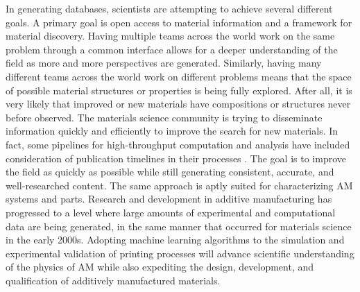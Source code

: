 In generating databases, scientists are attempting to achieve several different goals. A primary goal is open access to material information and a framework for material discovery. Having multiple teams across the world work on the same problem through a common interface allows for a deeper understanding of the field as more and more perspectives are generated. Similarly, having many different teams across the world work on different problems means that the space of possible material structures or properties is being fully explored. After all, it is very likely that improved or new materials have compositions or structures never before observed. The materials science community is trying to disseminate information quickly and efficiently to improve the search for new materials. In fact, some pipelines for high-throughput computation and analysis have included consideration of publication timelines in their processes \cite{Foster2015}. The goal is to improve the field as quickly as possible while still generating consistent, accurate, and well-researched content. The same approach is aptly suited for characterizing AM systems and parts. Research and development in additive manufacturing has progressed to a level where large amounts of experimental and computational data are being generated, in the same manner that occurred for materials science in the early 2000s. Adopting machine learning algorithms to the simulation and experimental validation of printing processes will advance scientific understanding of the physics of AM while also expediting the design, development, and qualification of additively manufactured materials. 
 
